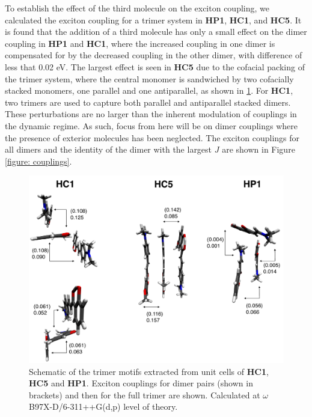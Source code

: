 To establish the effect of the third molecule on the exciton coupling, we calculated the exciton coupling for a trimer system in \textbf{HP1}, \textbf{HC1}, and \textbf{HC5}. It is found that the addition of a third molecule has only a small effect on the dimer coupling in \textbf{HP1} and \textbf{HC1}, where the increased coupling in one dimer is compensated for by the decreased coupling in the other dimer, with difference of less that 0.02 eV. The largest effect is seen in \textbf{HC5} due to the cofacial packing of the trimer system, where the central monomer is sandwiched by two cofacially stacked monomers, one parallel and one antiparallel, as shown in \ref{figure: trimer_couplings}. For \textbf{HC1}, two trimers are used to capture both parallel and antiparallel stacked dimers. 
These perturbations are no larger than the inherent modulation of couplings in the dynamic regime.\cite{Arago2015,Arago2016} As such, focus from here will be on dimer couplings where the presence of exterior molecules has been neglected. The exciton couplings for all dimers and the identity of the dimer with the largest $J$ are shown in Figure \ref{figure: couplings}. 
\begin{figure}[t]
\centering
  \includegraphics[width=0.8\linewidth]{5ConnectingCrystalStructure/trimer_couplings}
  \caption{Schematic of the trimer motifs extracted from unit cells of \textbf{HC1}, \textbf{HC5} and \textbf{HP1}. Exciton couplings for dimer pairs (shown in brackets) and then for the full trimer are shown. Calculated at $\omega$B97X-D/6-311++G(d,p) level of theory.}
  \label{figure: trimer_couplings}
\end{figure}


